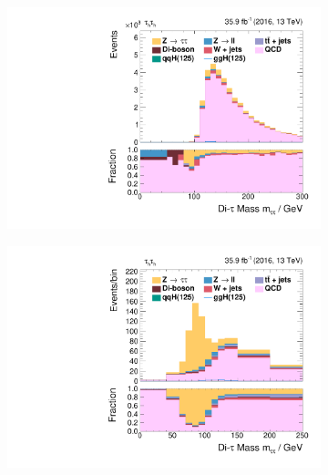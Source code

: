 \begin{figure}[h!]
    \centering
    \begin{subfigure}{.32\textwidth}
        \centering
        \includegraphics[width=\textwidth]{Figures/eventselection/tt/ZeroJetCP/m_sv.pdf}
    \end{subfigure}%
    \begin{subfigure}{.32\textwidth}
        \centering
        \includegraphics[width=\textwidth]{Figures/eventselection/tt/BoostedCP/m_sv.pdf}
    \end{subfigure}%
    \begin{subfigure}{.32\textwidth}
        \centering

\end{subfigure}
\end{figure}
